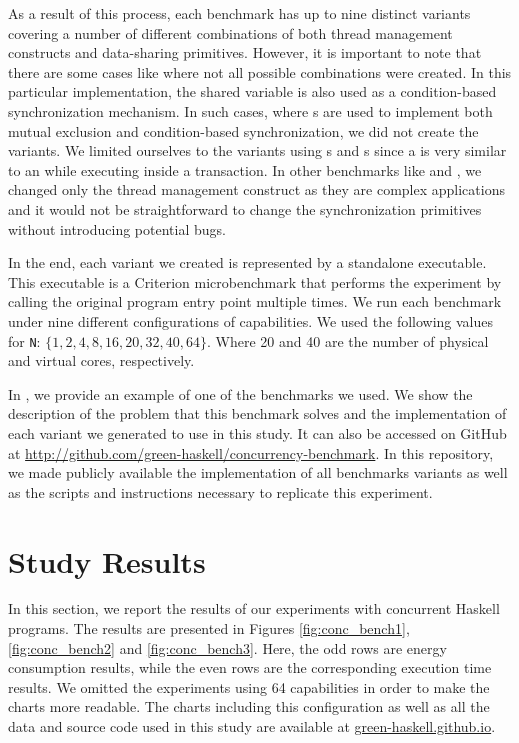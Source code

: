As a result of this process, each benchmark has up to nine distinct variants covering a number of different combinations of both thread management constructs and data-sharing primitives. However, it is important to note that there are some cases like \dining where not all possible combinations were created. In this particular implementation, the shared variable is also used as a condition-based synchronization mechanism. In such cases, where {\MVar}s are used to implement both mutual exclusion and condition-based synchronization, we did not create the \TVar variants. We limited ourselves to the variants using {\MVar}s and {\TMVar}s since a \TMVar is very similar to an \MVar while executing inside a transaction. In other benchmarks like \tsearch and \warp, we changed only the thread management construct as they are complex applications and it would not be straightforward to change the synchronization primitives without introducing potential bugs.

In the end, each variant we created is represented by a standalone executable. This executable is a Criterion microbenchmark that performs the experiment by calling the original program entry point multiple times. We run each benchmark under nine different configurations of capabilities. We used the following values for \texttt{N}: $\{1, 2, 4, 8, 16, 20, 32, 40, 64\}$. Where 20 and 40 are the number of physical and virtual cores, respectively.

In , we provide an example of one of the benchmarks we used. We show the description of the problem that this benchmark solves and the implementation of each variant we generated to use in this study. It can also be accessed on GitHub at \url{http://github.com/green-haskell/concurrency-benchmark}. In this repository, we made publicly available the implementation of all benchmarks variants as well as the scripts and instructions necessary to replicate this experiment.


\section{Study Results}\label{sec:results}
In this section, we report the results of our experiments with concurrent Haskell programs. The results are presented in Figures \ref{fig:conc_bench1}, \ref{fig:conc_bench2} and \ref{fig:conc_bench3}. Here, the odd rows are energy consumption results, while the even rows are the corresponding execution time results. We omitted the experiments using 64 capabilities in order to make the charts more readable. The charts including this configuration as well as all the data and source code used in this study are available at \href{http://green-haskell.github.io/}{green-haskell.github.io}.
\newline


